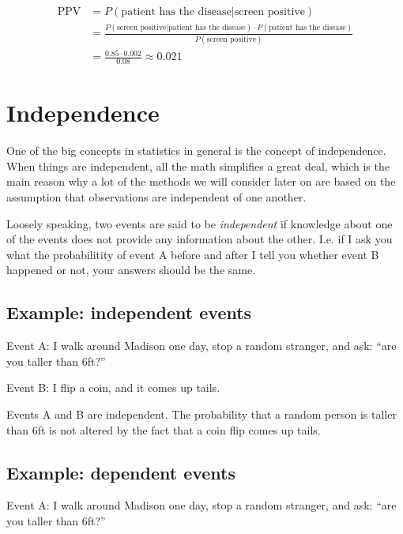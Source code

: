 \documentclass[]{book}
\theoremstyle{definition}
\theoremstyle{definition}
\theoremstyle{definition}
\theoremstyle{remark}
\begin{document}
\begin{align*}
  \text{PPV} &= P(\text{patient has the disease} | \text{screen positive}) \\
             &= \frac{P(\text{screen positive} | \text{patient has the disease}) \cdot P(\text{patient has the disease})}{P(\text{screen positive})} \\
             &= \frac{0.85 \cdot 0.002}{0.08} \approx 0.021
\end{align*}

\hypertarget{independence}{%
\section{Independence}\label{independence}}

One of the big concepts in statistics in general is the concept of independence. When things are independent, all the math simplifies a great deal, which is the main reason why a lot of the methods we will consider later on are based on the assumption that observations are independent of one another.

Loosely speaking, two events are said to be \emph{independent} if knowledge about one of the events does not provide any information about the other. I.e. if I ask you what the probabilitity of event A before and after I tell you whether event B happened or not, your answers should be the same.

\hypertarget{example-independent-events}{%
\subsection{Example: independent events}\label{example-independent-events}}

Event A: I walk around Madison one day, stop a random stranger, and ask: ``are you taller than 6ft?''

Event B: I flip a coin, and it comes up tails.

Events A and B are independent. The probability that a random person is taller than 6ft is not altered by the fact that a coin flip comes up tails.

\hypertarget{example-dependent-events}{%
\subsection{Example: dependent events}\label{example-dependent-events}}

Event A: I walk around Madison one day, stop a random stranger, and ask: ``are you taller than 6ft?''
\end{document}
